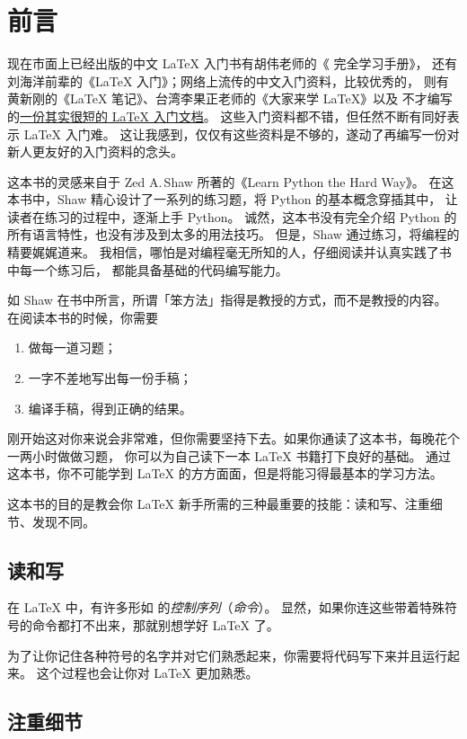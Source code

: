 \chapter{前言}
\label{chap:preface}
现在市面上已经出版的中文 \LaTeX{} 入门书有胡伟老师的《\LaTeXe{} 完全学习手册》，
还有刘海洋前辈的《\LaTeX{} 入门》；网络上流传的中文入门资料，比较优秀的，
则有黄新刚的《\LaTeX{} 笔记》、台湾李果正老师的《大家来学 \LaTeX{}》以及
不才编写的\href{http://liam0205.me/2014/09/08/latex-introduction/}%
  {\uline{一份其实很短的 \LaTeX{} 入门文档}}。
这些入门资料都不错，但任然不断有同好表示 \LaTeX{} 入门难。
这让我感到，仅仅有这些资料是不够的，遂动了再编写一份对新人更友好的入门资料的念头。

这本书的灵感来自于 Zed A.\,Shaw 所著的《Learn Python the Hard Way》。
在这本书中，Shaw 精心设计了一系列的练习题，将 Python 的基本概念穿插其中，
让读者在练习的过程中，逐渐上手 Python。
诚然，这本书没有完全介绍 Python 的所有语言特性，也没有涉及到太多的用法技巧。
但是，Shaw 通过练习，将编程的精要娓娓道来。
我相信，哪怕是对编程毫无所知的人，仔细阅读并认真实践了书中每一个练习后，
都能具备基础的代码编写能力。

如 Shaw 在书中所言，所谓「笨方法」指得是教授的方式，而不是教授的内容。
在阅读本书的时候，你需要
\begin{enumerate}
  \item 做每一道习题；
  \item 一字不差地写出每一份手稿；
  \item 编译手稿，得到正确的结果。
\end{enumerate}
刚开始这对你来说会非常难，但你需要坚持下去。如果你通读了这本书，每晚花个一两小时做做习题，
你可以为自己读下一本 \LaTeX{} 书籍打下良好的基础。
通过这本书，你不可能学到 \LaTeX{} 的方方面面，但是将能习得最基本的学习方法。

这本书的目的是教会你 \LaTeX{} 新手所需的三种最重要的技能：读和写、注重细节、发现不同。

\section*{读和写}
\label{sec:read_and_write}

在 \LaTeX{} 中，有许多形如 
的\emph{控制序列}（\emph{命令}）。
显然，如果你连这些带着特殊符号的命令都打不出来，那就别想学好 \LaTeX{} 了。

为了让你记住各种符号的名字并对它们熟悉起来，你需要将代码写下来并且运行起来。
这个过程也会让你对 \LaTeX{} 更加熟悉。

\section*{注重细节}
\label{sec:the_details}

